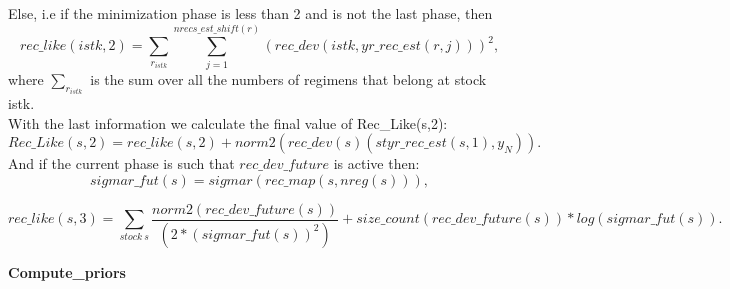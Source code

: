 \documentclass{article}
\begin{document}
Else, i.e if the minimization phase is less than 2 and is not the last phase, then 
\begin{equation}
    rec\_like(istk,2) = \sum_{r_{istk}}\sum_{j=1}^{nrecs\_est\_shift(r)}(rec\_dev(istk,yr\_rec\_est(r,j)))^2, 
\end{equation} 
where $\sum_{r_{istk}}$ is the sum over all the numbers of regimens that belong  at stock istk.\\

With the last information we calculate the final value of Rec\_Like(s,2):
\begin{equation}
    Rec\_Like(s,2) = rec\_like(s,2)+ norm2( rec\_dev(s)(styr\_rec\_est(s,1),y_N) ).
\end{equation}
And if the current phase is such that  $rec\_dev\_future$ is active then: 
\begin{equation}
    sigmar\_fut(s)=sigmar(rec\_map(s,nreg(s))),
\end{equation}

\begin{equation}
    rec\_like(s,3) = \sum_{stock \ s}\dfrac{norm2(rec\_dev\_future(s))}{(2*(sigmar\_fut(s))^2)} + size\_count(rec\_dev\_future(s))*log(sigmar\_fut(s)).
\end{equation}




\textbf{Compute\_priors}\\
\end{document}
